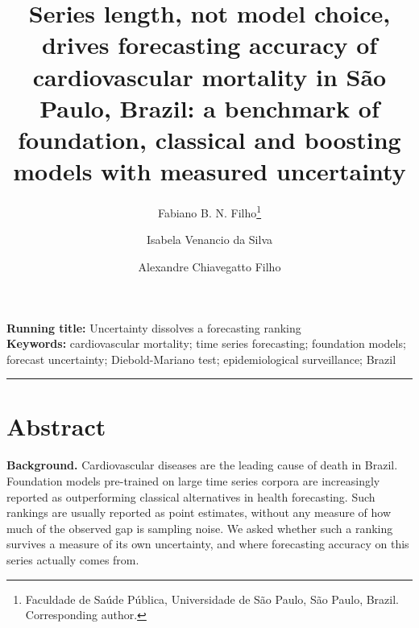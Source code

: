 

\title{\vspace{-2em}\large\bfseries Series length, not model choice, drives forecasting
accuracy of cardiovascular mortality in S\~ao Paulo, Brazil: a benchmark of foundation,
classical and boosting models with measured uncertainty}

\author{Fabiano B. N. Filho\thanks{Faculdade de Sa\'ude P\'ublica, Universidade de
S\~ao Paulo, S\~ao Paulo, Brazil. Corresponding author.} \and
Isabela Venancio da Silva\footnotemark[1] \and
Alexandre Chiavegatto Filho\footnotemark[1]}

\date{}


\maketitle

\noindent\textbf{Running title:} Uncertainty dissolves a forecasting ranking \\
\textbf{Keywords:} cardiovascular mortality; time series forecasting; foundation models;
forecast uncertainty; Diebold-Mariano test; epidemiological surveillance; Brazil

\vspace{1em}
\hrule
\vspace{1em}

\section*{Abstract}

\noindent\textbf{Background.} Cardiovascular diseases are the leading cause of death in
Brazil. Foundation models pre-trained on large time series corpora are increasingly
reported as outperforming classical alternatives in health forecasting. Such rankings are
usually reported as point estimates, without any measure of how much of the observed gap
is sampling noise. We asked whether such a ranking survives a measure of its own
uncertainty, and where forecasting accuracy on this series actually comes from.


